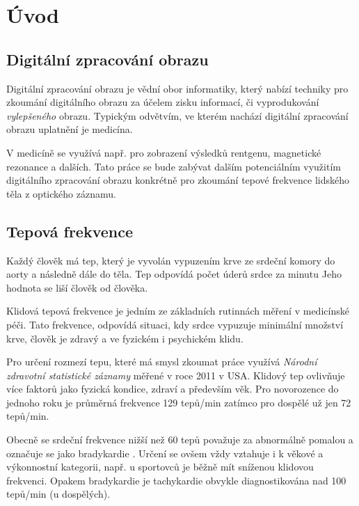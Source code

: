 \documentclass[
  digital, %
  table,   %
%
  lof,     %
  lot,     %
]{fithesis3}
\begin{document}
\chapter{Úvod}
\section{Digitální zpracování obrazu}
Digitální zpracování obrazu je vědní obor informatiky, který nabízí techniky pro zkoumání digitálního obrazu za účelem zisku informací, či vyprodukování \emph{vylepšeného} obrazu. Typickým odvětvím, ve kterém nachází digitální zpracování obrazu uplatnění je medicína.

V medicíně se využívá např. pro zobrazení výsledků rentgenu, magnetické rezonance a dalších. Tato práce se bude zabývat dalším potenciálním využitím digitálního zpracování obrazu konkrétně pro zkoumání tepové frekvence lidského těla z optického záznamu.

\section{Tepová frekvence}
Každý člověk má tep, který je vyvolán vypuzením krve ze srdeční komory do aorty a následně dále do těla. Tep odpovídá počet úderů srdce za minutu Jeho hodnota se liší člověk od člověka.

Klidová tepová frekvence je jedním ze základních rutinnách měření v medicínské péči. Tato frekvence, odpovídá situaci, kdy srdce vypuzuje minimální množství krve, člověk je zdravý a ve fyzickém i psychickém klidu.

Pro určení rozmezí tepu, které má smysl zkoumat práce využívá \emph{Národní zdravotní statistické záznamy}\cite{national-health-statistics-reports} měřené v roce 2011 v USA. Klidový tep ovlivňuje více faktorů jako fyzická kondice, zdraví a především věk. Pro novorozence do jednoho roku je průměrná frekvence 129 tepů/min zatímco pro dospělé už jen 72 tepů/min.

Obecně se srdeční frekvence nižší než 60 tepů považuje za abnormálně pomalou a označuje se jako bradykardie
\cite{http://www.heart.org/HEARTORG/Conditions/Arrhythmia/AboutArrhythmia/Bradycardia-Slow-Heart-Rate_UCM_302016_Article.jsp}.
Určení se ovšem vždy vztahuje i k věkové a výkonnostní kategorii, např. u sportovců je běžně mít sníženou klidovou frekvenci. Opakem bradykardie je tachykardie
\cite{http://www.heart.org/HEARTORG/Conditions/Arrhythmia/AboutArrhythmia/Tachycardia-Fast-Heart-Rate_UCM_302018_Article.jsp} obvykle diagnostikována nad 100 tepů/min (u dospělých).
\end{document}
